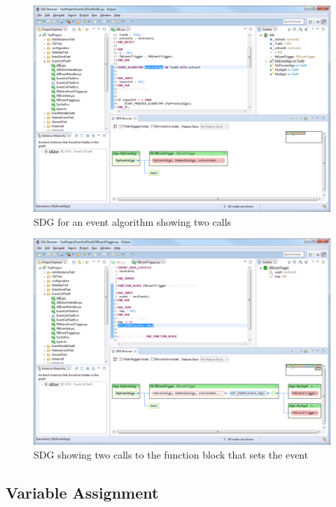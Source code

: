 \begin{figure}[p]
  \centering
    \includegraphics[width=\textwidth]{bilder/manual-event1}
  \caption{SDG for an event algorithm showing two calls}
  \label{fig:manual-event1}
\end{figure}

\begin{figure}[p]
  \centering
    \includegraphics[width=\textwidth]{bilder/manual-event2}
  \caption{SDG showing two calls to the function block that sets the event}
  \label{fig:manual-event2}
\end{figure}

\subsection*{Variable Assignment}

